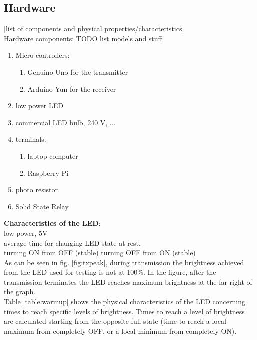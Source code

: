 \subsection{Hardware}
[list of components and physical properties/characteristics]\\
Hardware components: TODO list models and stuff
\begin{enumerate}
\item Micro controllers:
\begin{enumerate}
\item Genuino Uno for the transmitter
\item Arduino Yun for the receiver
\end{enumerate}
\item low power LED
\item commercial LED bulb, 240 V, ...
\item terminals:
\begin{enumerate}
\item laptop computer
\item Raspberry Pi
\end{enumerate}
\item photo resistor
\item Solid State Relay
\end{enumerate}
\textbf{Characteristics of the LED}:\\
low power, 5V \\
average time for changing LED state at rest. \\
turning ON from OFF (stable)
turning OFF from ON (stable) \\
As can be seen in fig. \ref{fig:txpeak}, during transmission the brightness achieved from the LED used for testing is not at 100\%. In the figure, after the transmission terminates the LED reaches maximum brightness at the far right of the graph.\\ Table \ref{table:warmup} shows the physical characteristics of the LED concerning times to reach specific levels of brightness. Times to reach a level of brightness are calculated starting from the opposite full state (time to reach a local maximum from completely OFF, or a local minimum from completely ON).
